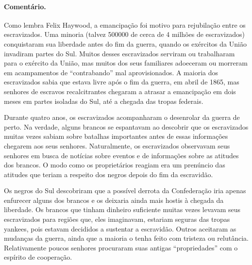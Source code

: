 \paragraph{Comentário.}\quad
{\small
Como lembra Felix Haywood, a emancipação foi motivo para
rejubilação entre os escravizados. Uma minoria (talvez 500000 de cerca de 4
milhões de escravizados) conquistaram sua liberdade antes do fim da guerra,
quando os exércitos da União invadiram partes do Sul. Muitos desses
escravizados serviram ou trabalharam para o exército da União, mas muitos
dos seus familiares adoeceram ou morreram em acampamentos de
``contrabando'' mal aprovisionados. A maioria dos escravizados sabia que
estava livre após o fim da guerra, em abril de 1865, mas senhores de
escravos recalcitrantes chegaram a atrasar a emancipação em dois meses
em partes isoladas do Sul, até a chegada das tropas federais.

Durante quatro anos, os escravizados acompanharam o desenrolar da
guerra de perto. Na verdade, alguns brancos se espantavam ao descobrir
que os escravizados muitas vezes sabiam sobre batalhas importantes antes de
essas informações chegarem aos seus senhores. Naturalmente, os escravizados
observavam seus senhores em busca de notícias sobre eventos e de
informações sobre as atitudes dos brancos. O modo como os proprietários
reagiam era um prenúncio das atitudes que teriam a respeito dos negros
depois do fim da escravidão.

Os negros do Sul descobriram que a possível derrota da
Confederação iria apenas enfurecer alguns dos brancos e os deixaria
ainda mais hostis à chegada da liberdade. Os brancos que tinham dinheiro
suficiente muitas vezes levavam seus escravizados para regiões que, eles
imaginavam, estariam seguras das tropas yankees, pois estavam decididos
a sustentar a escravidão. Outros aceitaram as mudanças da guerra, ainda
que a maioria o tenha feito com tristeza ou relutância. Relativamente
poucos senhores procuraram suas antigas ``propriedades'' com o espírito
de cooperação.
}

